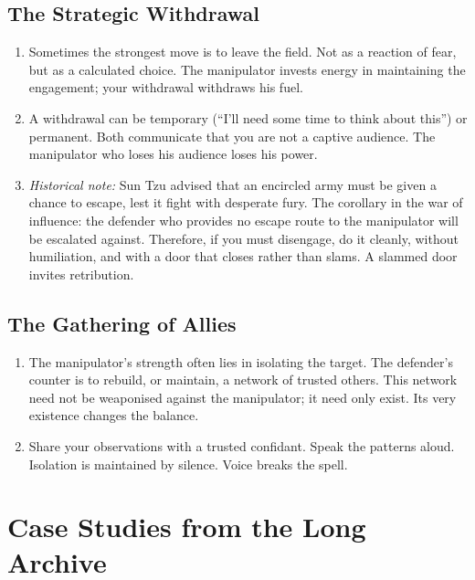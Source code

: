\documentclass[12pt,a4paper,oneside]{book}
\begin{document}
\section{The Strategic Withdrawal}
\begin{enumerate}[leftmargin=*, label=\arabic*.]
\item Sometimes the strongest move is to leave the field. Not as a reaction of fear, but as a calculated choice. The manipulator invests energy in maintaining the engagement; your withdrawal withdraws his fuel.
\item A withdrawal can be temporary (“I'll need some time to think about this”) or permanent. Both communicate that you are not a captive audience. The manipulator who loses his audience loses his power.
\item \textit{Historical note:} Sun Tzu advised that an encircled army must be given a chance to escape, lest it fight with desperate fury. The corollary in the war of influence: the defender who provides no escape route to the manipulator will be escalated against. Therefore, if you must disengage, do it cleanly, without humiliation, and with a door that closes rather than slams. A slammed door invites retribution.
\end{enumerate}

\section{The Gathering of Allies}
\begin{enumerate}[leftmargin=*, label=\arabic*.]
\item The manipulator's strength often lies in isolating the target. The defender's counter is to rebuild, or maintain, a network of trusted others. This network need not be weaponised against the manipulator; it need only exist. Its very existence changes the balance.
\item Share your observations with a trusted confidant. Speak the patterns aloud. Isolation is maintained by silence. Voice breaks the spell.
\end{enumerate}

\chapter{Case Studies from the Long Archive}
\end{document}
